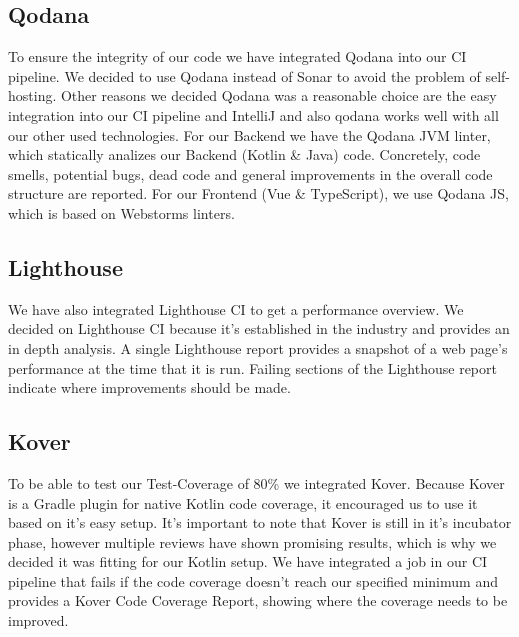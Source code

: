 \subsection{Qodana}
To ensure the integrity of our code we have integrated Qodana into our CI pipeline. We decided to use Qodana instead of Sonar to avoid the problem of self-hosting. 
Other reasons we decided Qodana was a reasonable choice are the easy integration into our CI pipeline and IntelliJ and also qodana works well with all our other used technologies. 
For our Backend we have the Qodana JVM linter, which statically analizes our Backend (Kotlin \& Java) code. Concretely, code smells, potential bugs, dead code and general improvements in the overall code structure are reported.
For our Frontend (Vue \& TypeScript), we use Qodana JS, which is based on Webstorms linters.

\subsection{Lighthouse}
We have also integrated Lighthouse CI to get a performance overview. We decided on Lighthouse CI because it's established in the industry and provides an in depth analysis.
A single Lighthouse report provides a snapshot of a web page's performance at the time that it is run.
Failing sections of the Lighthouse report indicate where improvements should be made. 

\subsection{Kover}
To be able to test our Test-Coverage of 80\% we integrated Kover. Because Kover is a Gradle plugin for native Kotlin code coverage, it encouraged us to use it based on it's easy setup.
It's important to note that Kover is still in it's incubator phase, however multiple reviews have shown promising results, which is why we decided it was fitting for our Kotlin setup. 
We have integrated a job in our CI pipeline that fails if the code coverage doesn't reach our specified minimum and provides a Kover Code Coverage Report, showing where the coverage needs to be improved. 

